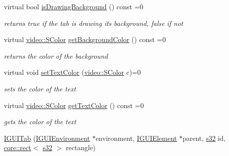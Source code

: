 \begin{DoxyCompactItemize}
\mbox{\label{classirr_1_1gui_1_1IGUITab_ab357a99f63a7ecbd3da5adbc24f43e58}} 
virtual bool \hyperlink{classirr_1_1gui_1_1IGUITab_ab357a99f63a7ecbd3da5adbc24f43e58}{is\+Drawing\+Background} () const =0
\begin{DoxyCompactList}\small\item\em returns true if the tab is drawing its background, false if not \end{DoxyCompactList}\item 
\mbox{\label{classirr_1_1gui_1_1IGUITab_ab9c9bd6b40bf90482d429d9a87f7e06c}} 
virtual \hyperlink{classirr_1_1video_1_1SColor}{video\+::\+S\+Color} \hyperlink{classirr_1_1gui_1_1IGUITab_ab9c9bd6b40bf90482d429d9a87f7e06c}{get\+Background\+Color} () const =0
\begin{DoxyCompactList}\small\item\em returns the color of the background \end{DoxyCompactList}\item 
\mbox{\label{classirr_1_1gui_1_1IGUITab_a56f7e206931506705b3a54674d6b8603}} 
virtual void \hyperlink{classirr_1_1gui_1_1IGUITab_a56f7e206931506705b3a54674d6b8603}{set\+Text\+Color} (\hyperlink{classirr_1_1video_1_1SColor}{video\+::\+S\+Color} c)=0
\begin{DoxyCompactList}\small\item\em sets the color of the text \end{DoxyCompactList}\item 
\mbox{\label{classirr_1_1gui_1_1IGUITab_a91cd857c91bbbbe9a216adadf9ea3b8f}} 
virtual \hyperlink{classirr_1_1video_1_1SColor}{video\+::\+S\+Color} \hyperlink{classirr_1_1gui_1_1IGUITab_a91cd857c91bbbbe9a216adadf9ea3b8f}{get\+Text\+Color} () const =0
\begin{DoxyCompactList}\small\item\em gets the color of the text \end{DoxyCompactList}\item 
\mbox{\label{classirr_1_1gui_1_1IGUITab_a27026e3a71397700290289ea206b0b86}} 
\hyperlink{classirr_1_1gui_1_1IGUITab_a27026e3a71397700290289ea206b0b86}{I\+G\+U\+I\+Tab} (\hyperlink{classirr_1_1gui_1_1IGUIEnvironment}{I\+G\+U\+I\+Environment} $\ast$environment, \hyperlink{classirr_1_1gui_1_1IGUIElement}{I\+G\+U\+I\+Element} $\ast$parent, \hyperlink{namespaceirr_ac66849b7a6ed16e30ebede579f9b47c6}{s32} id, \hyperlink{classirr_1_1core_1_1rect}{core\+::rect}$<$ \hyperlink{namespaceirr_ac66849b7a6ed16e30ebede579f9b47c6}{s32} $>$ rectangle)

\end{DoxyCompactItemize}
